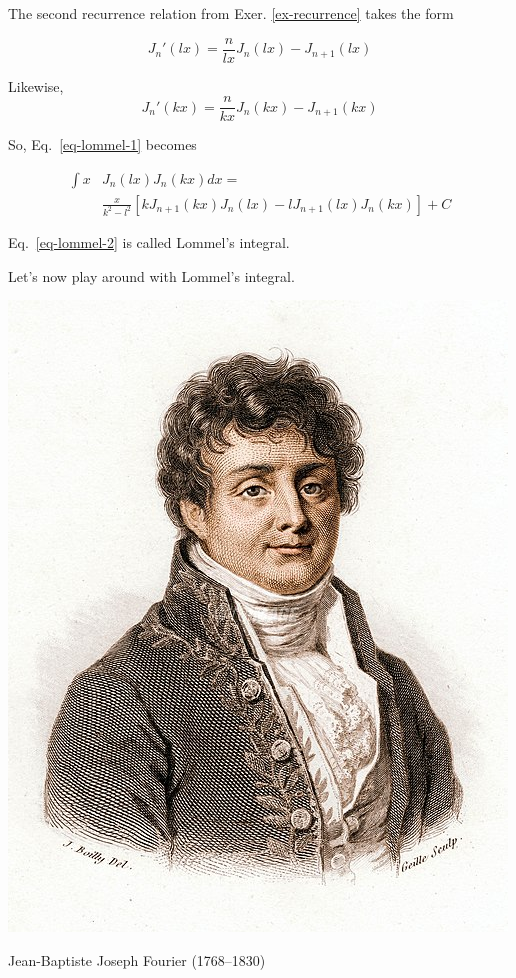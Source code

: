 The second recurrence relation from Exer. \ref{ex-recurrence} takes the form

\begin{equation}
J_n'(lx) =  \frac{n}{lx}J_n(lx)-J_{n+1}(lx)
\end{equation} 

Likewise,
\begin{equation}
J_n'(kx) =  \frac{n}{kx}J_n(kx)-J_{n+1}(kx)
\end{equation} 

So, Eq.~\ref{eq-lommel-1} becomes

\begin{align}
  \int x & J_n(lx)J_n(kx)dx = \nonumber \\
  & \frac{x}{k^2 - l^2} \left[{k J_{n+1}(kx) J_n(lx) - l J_{n+1}(lx) J_n(kx)}\right] + C \label{eq-lommel-2}
\end{align} 

Eq.~\ref{eq-lommel-2} is called Lommel's integral.


\pagebreak



Let's now play around with Lommel's integral.

\begin{marginfigure}[-.3cm]
  \includegraphics{bessel/figures/j_fourier}
  \caption{Jean-Baptiste Joseph Fourier (1768–1830)}
\end{marginfigure}

